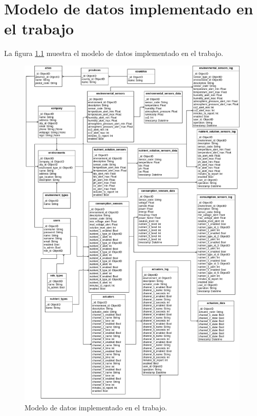 \chapter{Modelo de datos implementado en el trabajo}

\label{AppendixA} 

La figura \ref{fig:modDat} muestra el modelo de datos implementado en el trabajo.

\begin{figure}[H]
  \centering
  \includegraphics[width=0.99\textwidth]{Images/15-completo.png}
  \caption{Modelo de datos implementado en el trabajo.}
  \label{fig:modDat}
\end{figure}


